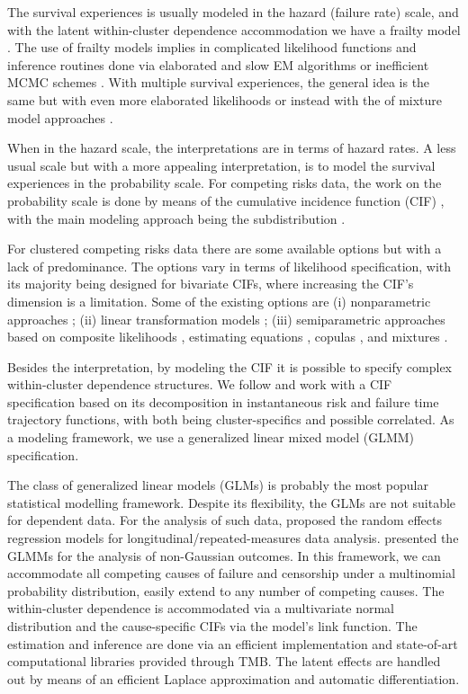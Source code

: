 \documentclass[a4paper,12pt]{article}
\begin{document}
The survival experiences is usually modeled in the hazard (failure rate)
scale, and with the latent within-cluster dependence accommodation we
have a frailty model \citep{frailty78,frailty79,liang95,petersen98}. The
use of frailty models implies in complicated likelihood functions and
inference routines done via elaborated and slow EM algorithms
\citep{nielsen92,klein92} or inefficient MCMC schemes
\citep{hougaard00}. With multiple survival experiences, the general idea
is the same but with even more elaborated likelihoods
\citep{prentice78,therneau00} or instead with the of mixture model
approaches \citep{larson85,kuk92}.

When in the hazard scale, the interpretations are in terms of hazard
rates. A less usual scale but with a more appealing interpretation, is
to model the survival experiences in the probability scale. For
competing risks data, the work on the probability scale is done by means
of the cumulative incidence function (CIF) \citep{andersen12}, with the
main modeling approach being the subdistribution \citep{fine&gray}.

For clustered competing risks data there are some available options but
with a lack of predominance. The options vary in terms of likelihood
specification, with its majority being designed for bivariate CIFs,
where increasing the CIF's dimension is a limitation. Some of the
existing options are (i) nonparametric approaches
\citep{cheng07,cheng09}; (ii) linear transformation models
\citep{fine99,gerds12}; (iii) semiparametric approaches based on
composite likelihoods \citep{shih,SCHEIKE}, estimating equations
\citep{crossoddsratioSCHEIKE,cheng&fine}, copulas
\citep{semiparametricSCHEIKE}, and mixtures \citep{naskar05,shi13}.

Besides the interpretation, by modeling the CIF it is possible to
specify complex within-cluster dependence structures. We follow
\cite{SCHEIKE} and work with a CIF specification based on its
decomposition in instantaneous risk and failure time trajectory
functions, with both being cluster-specifics and possible correlated. As
a modeling framework, we use a generalized linear mixed model (GLMM)
specification.

The class of generalized linear models (GLMs) \citep{GLM72} is probably
the most popular statistical modelling framework. Despite its
flexibility, the GLMs are not suitable for dependent data. For the
analysis of such data, \cite{laird82} proposed the random effects
regression models for longitudinal/repeated-measures data
analysis. \cite{breslow93} presented the GLMMs for the analysis of
non-Gaussian outcomes. In this framework, we can accommodate all
competing causes of failure and censorship under a multinomial
probability distribution, easily extend to any number of competing
causes. The within-cluster dependence is accommodated via a multivariate
normal distribution and the cause-specific CIFs via the model's link
function. The estimation and inference are done via an efficient
implementation and state-of-art computational libraries provided through
TMB. The latent effects are handled out by means of an efficient Laplace
approximation and automatic differentiation.
\end{document}
